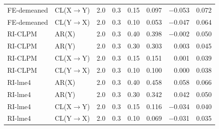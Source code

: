 \documentclass[12pt]{article}
\begin{document}
\begin{table}[H]
\begin{tabular}[t]{llrrrrrr}
FE-demeaned & CL(X$\rightarrow$Y) & 2.0 & 0.3 & 0.15 & 0.097 & $-$0.053 & 0.072\\
FE-demeaned & CL(Y$\rightarrow$X) & 2.0 & 0.3 & 0.10 & 0.053 & $-$0.047 & 0.064\\
RI-CLPM & AR(X) & 2.0 & 0.3 & 0.40 & 0.398 & $-$0.002 & 0.050\\
RI-CLPM & AR(Y) & 2.0 & 0.3 & 0.30 & 0.303 & 0.003 & 0.045\\
\addlinespace
RI-CLPM & CL(X$\rightarrow$Y) & 2.0 & 0.3 & 0.15 & 0.151 & 0.001 & 0.039\\
RI-CLPM & CL(Y$\rightarrow$X) & 2.0 & 0.3 & 0.10 & 0.100 & 0.000 & 0.038\\
RI-lme4 & AR(X) & 2.0 & 0.3 & 0.40 & 0.458 & 0.058 & 0.066\\
RI-lme4 & AR(Y) & 2.0 & 0.3 & 0.30 & 0.342 & 0.042 & 0.050\\
RI-lme4 & CL(X$\rightarrow$Y) & 2.0 & 0.3 & 0.15 & 0.116 & $-$0.034 & 0.040\\
\addlinespace
RI-lme4 & CL(Y$\rightarrow$X) & 2.0 & 0.3 & 0.10 & 0.069 & $-$0.031 & 0.035\\
\bottomrule
\end{tabular}
\end{table}


\end{document}
